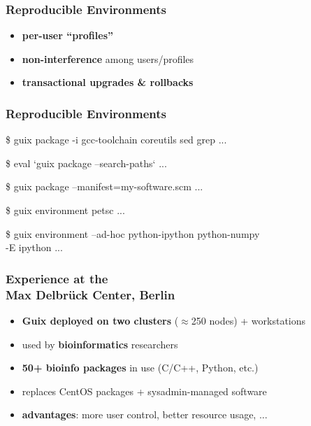 \documentclass{beamer}
\newcommand{\highlight}[1]{\alert{\textbf{#1}}}
\begin{document}
\begin{frame}[fragile]
  \frametitle{Reproducible Environments}

  \Large{
    \begin{itemize}
    \item \textbf{per-user ``profiles''}
    \item \textbf{non-interference} among users/profiles
    \item \textbf{transactional upgrades \& rollbacks}
    \end{itemize}
  }
\end{frame}

\begin{frame}[fragile]
  \frametitle{Reproducible Environments}

  \begin{semiverbatim}
\$ guix package -i gcc-toolchain coreutils sed grep
\textrm{...}

\$ eval `guix package --search-paths`
\textrm{...}

\$ guix package --manifest=my-software.scm
\textrm{...}

\$ guix environment petsc
\textrm{...}

\$ guix environment --ad-hoc python-ipython python-numpy \\
    -E ipython
\textrm{...}
  \end{semiverbatim}

\end{frame}

\begin{frame}
  \frametitle{Experience at the\\Max Delbrück Center, Berlin}

  \large{
  \begin{itemize}
    \item \textbf{Guix deployed on two clusters} ($\approx$250 nodes) + workstations
    \item used by \textbf{bioinformatics} researchers
    \item \textbf{50+ bioinfo packages} in use (C/C++, Python,
      etc.)
    \item replaces CentOS packages + sysadmin-managed software
    \item<2-> \highlight{advantages}: more user control, better resource
      usage, ...
  \end{itemize}
  }
\end{frame}
\end{document}
